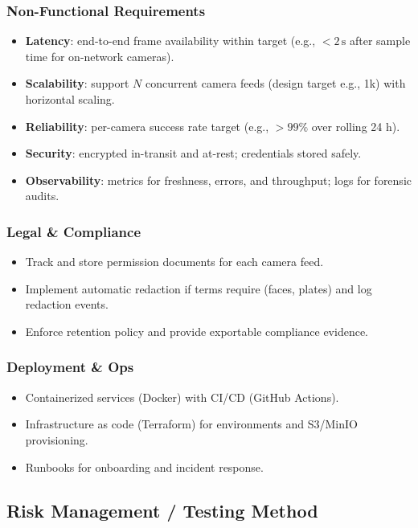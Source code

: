 \subsubsection{Non-Functional Requirements}
\begin{itemize}
  \item \textbf{Latency}: end-to-end frame availability within target (e.g., $<2\,\text{s}$ after sample time for on-network cameras).
  \item \textbf{Scalability}: support $N$ concurrent camera feeds (design target e.g., 1k) with horizontal scaling.
  \item \textbf{Reliability}: per-camera success rate target (e.g., $>99\%$ over rolling 24 h).
  \item \textbf{Security}: encrypted in-transit and at-rest; credentials stored safely.
  \item \textbf{Observability}: metrics for freshness, errors, and throughput; logs for forensic audits.
\end{itemize}

\subsubsection{Legal \& Compliance}
\begin{itemize}
  \item Track and store permission documents for each camera feed.
  \item Implement automatic redaction if terms require (faces, plates) and log redaction events.
  \item Enforce retention policy and provide exportable compliance evidence.
\end{itemize}

\subsubsection{Deployment \& Ops}
\begin{itemize}
  \item Containerized services (Docker) with CI/CD (GitHub Actions).
  \item Infrastructure as code (Terraform) for environments and S3/MinIO provisioning.
  \item Runbooks for onboarding and incident response.
\end{itemize}

\subsection{Risk Management / Testing Method}
